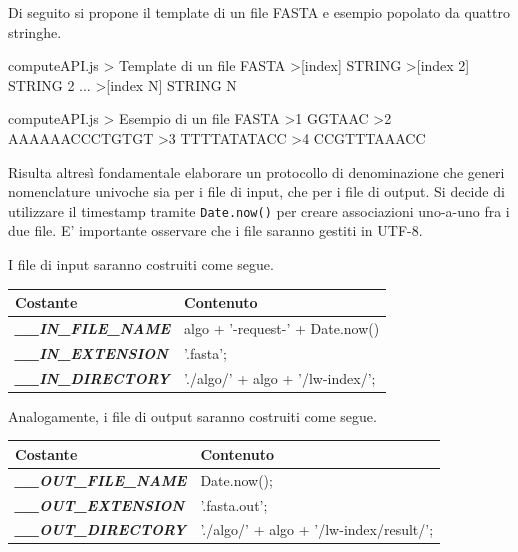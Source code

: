 Di seguito si propone il template di un file FASTA e esempio popolato da quattro stringhe.

\begin{sexylisting}{computeAPI.js > Template di un file FASTA}
>[index]
STRING
>[index 2]
STRING 2
...
>[index N]
STRING N
\end{sexylisting}

\begin{sexylisting}{computeAPI.js > Esempio di un file FASTA}
>1
GGTAAC
>2
AAAAAACCCTGTGT
>3
TTTTATATACC
>4
CCGTTTAAACC
\end{sexylisting}

Risulta altresì fondamentale elaborare un protocollo di denominazione che generi nomenclature univoche sia per i file di input, che per i file di output. Si decide di utilizzare il timestamp tramite \verb|Date.now()| per creare associazioni uno-a-uno fra i due file. E' importante osservare che i file saranno gestiti in UTF-8.

\vspace{5mm}

I file di input saranno costruiti come segue.

\begin{table}[H]
\centering
\begin{tabular}{@{}ll@{}}
\toprule
\textbf{Costante}                    & \textbf{Contenuto}               \\ \midrule
\textit{\textbf{\_\_IN\_FILE\_NAME}} & algo + '-request-' + Date.now()  \\
\textit{\textbf{\_\_IN\_EXTENSION}}  & '.fasta';                        \\
\textit{\textbf{\_\_IN\_DIRECTORY}}  & './algo/' + algo + '/lw-index/'; \\ \bottomrule
\end{tabular}
\end{table}

Analogamente, i file di output saranno costruiti come segue.

\begin{table}[H]
\centering
\begin{tabular}{ll}
\hline
\textbf{Costante}                     & \textbf{Contenuto}                      \\ \hline
\textit{\textbf{\_\_OUT\_FILE\_NAME}} & Date.now();                             \\
\textit{\textbf{\_\_OUT\_EXTENSION}}  & '.fasta.out';                           \\
\textit{\textbf{\_\_OUT\_DIRECTORY}}  & './algo/' + algo + '/lw-index/result/'; \\ \hline
\end{tabular}
\end{table}

